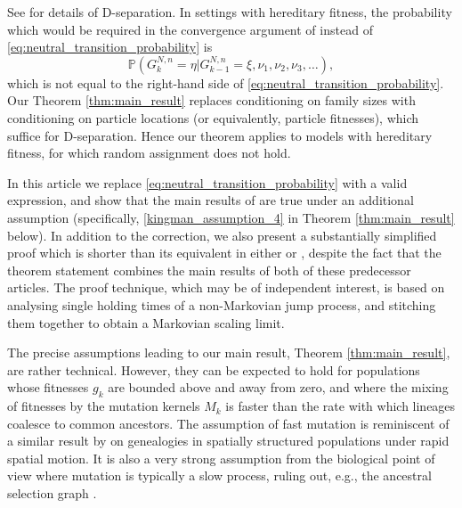 \documentclass[a4paper,11pt]{article}
\theoremstyle{definition}
\newcommand{\bbP}{\mathbb{P}}
\begin{document}
See \cite[Chapter 3]{pearl:1988} for details of D-separation.
In settings with hereditary fitness, the probability which would be required in the convergence argument of \cite{koskela2020annals} instead of \eqref{eq:neutral_transition_probability} is 
\begin{equation*}
\bbP( G_k^{ N, n } = \eta | G_{ k - 1 }^{ N, n } = \xi, \nu_1, \nu_2, \nu_3, \ldots ),
\end{equation*}
which is not equal to the right-hand side of \eqref{eq:neutral_transition_probability}.
Our Theorem \ref{thm:main_result} replaces conditioning on family sizes with conditioning on particle locations (or equivalently, particle fitnesses), which suffice for D-separation.
Hence our theorem applies to models with hereditary fitness, for which random assignment does not hold.


In this article we replace \eqref{eq:neutral_transition_probability} with a valid expression, and show that the main results of \cite{brown:2021, brownetal:2021, brownetal:2023, koskela2020annals} are true under an additional assumption (specifically, \eqref{kingman_assumption_4} in Theorem \ref{thm:main_result} below).
In addition to the correction, we also present a substantially simplified proof which is shorter than its equivalent in either \cite{koskela2020annals} or \cite{brownetal:2023}, despite the fact that the theorem statement combines the main results of both of these predecessor articles.
The proof technique, which may be of independent interest, is based on analysing single holding times of a non-Markovian jump process, and stitching them together to obtain a Markovian scaling limit.

The precise assumptions leading to our main result, Theorem \ref{thm:main_result}, are rather technical.
However, they can be expected to hold for populations whose fitnesses $g_k$ are bounded above and away from zero, and where the mixing of fitnesses by the mutation kernels $M_k$ is faster than the rate with which lineages coalesce to common ancestors.
The assumption of fast mutation is reminiscent of a similar result by \cite{hossjer:2011} on genealogies in spatially structured populations under rapid spatial motion.
It is also a very strong assumption from the biological point of view where mutation is typically a slow process, ruling out, e.g., the ancestral selection graph \cite{krone1997}.
\end{document}
